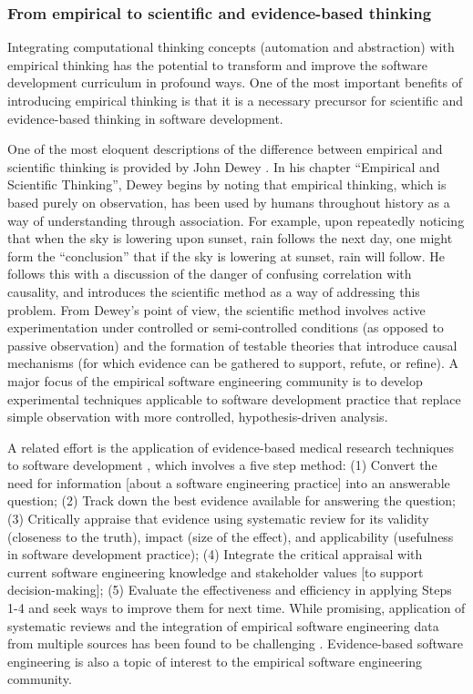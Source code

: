 \subsubsection{From empirical to scientific and evidence-based thinking}

Integrating computational thinking concepts (automation and abstraction)
with empirical thinking has the potential to transform and improve the
software development curriculum in profound ways. One of the most important
benefits of introducing empirical thinking is that it is a necessary
precursor for scientific and evidence-based thinking in software
development.

One of the most eloquent descriptions of the difference between empirical
and scientific thinking is provided by John Dewey \citep{Dewey10}.  In his
chapter ``Empirical and Scientific Thinking'', Dewey begins by noting that
empirical thinking, which is based purely on observation, has been used by
humans throughout history as a way of understanding through association.
For example, upon repeatedly noticing that when the sky is lowering upon
sunset, rain follows the next day, one might form the ``conclusion'' that
if the sky is lowering at sunset, rain will follow.  He follows this with a
discussion of the danger of confusing correlation with causality, and
introduces the scientific method as a way of addressing this problem.  From
Dewey's point of view, the scientific method involves active
experimentation under controlled or semi-controlled conditions (as opposed
to passive observation) and the formation of testable theories that
introduce causal mechanisms (for which evidence can be gathered to support,
refute, or refine).  A major focus of the empirical software engineering
community is to develop experimental techniques applicable to software
development practice that replace simple observation with more controlled,
hypothesis-driven analysis.

A related effort is the application of evidence-based medical research
techniques to software development \citep{Kitchenham04,Kitchenham04a},
which involves a five step method: (1) Convert the need for information
[about a software engineering practice] into an answerable question; (2)
Track down the best evidence available for answering the question; (3)
Critically appraise that evidence using systematic review for its validity
(closeness to the truth), impact (size of the effect), and applicability
(usefulness in software development practice); (4) Integrate the critical
appraisal with current software engineering knowledge and stakeholder
values [to support decision-making]; (5) Evaluate the effectiveness and
efficiency in applying Steps 1-4 and seek ways to improve them for next
time.  While promising, application of systematic reviews and the
integration of empirical software engineering data from multiple sources
has been found to be challenging \cite{Jedlitschka04}.  Evidence-based
software engineering is also a topic of interest to the empirical software
engineering community.

